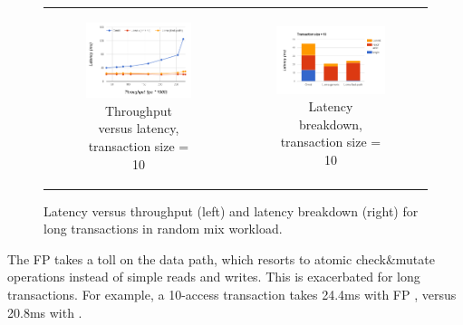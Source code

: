\begin{figure}[t]
\begin{tabular}{cc}
    \begin{subfigure}[t]{0.5\textwidth}
	\includegraphics[width=\textwidth]{figs/thpt-latency-10.png}
	\caption[]{Throughput versus latency, transaction size = 10}
    \label{fig:tl-10}
  \end{subfigure} &
  
  \begin{subfigure}[t]{0.5\textwidth}
	\includegraphics[width=.9\textwidth]{figs/stack-tx10.png}
	\caption[]{Latency breakdown, transaction size = 10}
    \label{fig:stack-tx10}
  \end{subfigure} 
\end{tabular}  			
  \caption{Latency versus throughput (left) and latency breakdown (right) for long transactions in random mix workload. }
  \label{fig:throughput-latency}
\end{figure}

The FP takes a toll on the data path, which resorts to atomic check\&mutate operations 
instead of simple reads and writes. This is exacerbated for long transactions. 
For example, a 10-access transaction takes 24.4ms with FP \sys, 
versus 20.8ms with \sys. 

